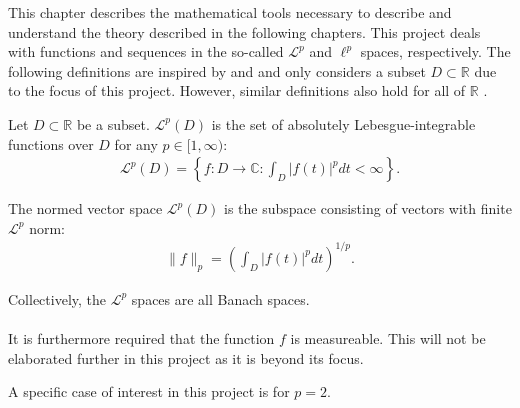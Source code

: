 This chapter describes the mathematical tools necessary to describe and understand the theory described in the following chapters. This project deals with functions and sequences in the so-called $\mathcal{L}^p$ and $\ell^p$ spaces, respectively. The following definitions are inspired by \cite{chapter 5-6, FSE2010} and \cite{chapter 2, FSP} and only considers a subset $D \subset \mathbb{R}$ due to the focus of this project. However, similar definitions also hold for all of $\mathbb{R}$ .

\begin{definition} \label{def:Lpspace}
Let $D \subset \mathbb{R}$ be a subset. $\mathcal{L}^p(D)$ is the set of absolutely Lebesgue-integrable functions over $D$ for any $p \in [1,\infty)$:
\begin{align*}
\mathcal{L}^p(D) = \left\{ f: D \to \mathbb{C}: \int_D |f(t)|^p dt < \infty \right\}.
\end{align*}

The normed vector space $\mathcal{L}^p(D)$ is the subspace consisting of vectors with finite $\mathcal{L}^p$ norm:
\begin{align*}
\|f\|_p = \left( \int_D |f(t)|^p dt \right)^{1/p}.
\end{align*}

Collectively, the $\mathcal{L}^p$ spaces are all Banach spaces.
\\ \\
It is furthermore required that the function $f$ is measureable. This will not be elaborated further in this project as it is beyond its focus.
\end{definition}

A specific case of interest in this project is for $p = 2$.

